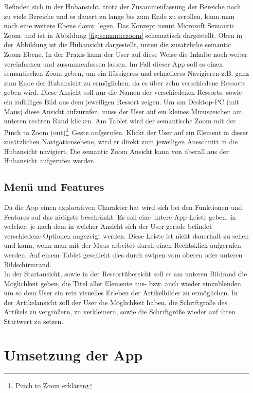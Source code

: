 \documentclass[12pt,a4paper]{scrartcl}
\begin{document}
Befinden sich in der Hubansicht, trotz der Zusammenfassung der Bereiche noch zu viele Bereiche und es dauert zu lange bis zum Ende zu scrollen, kann man noch eine weitere Ebene \glqq davor\grqq\ legen. Das Konzept nennt Microsoft \glqq Semantic Zoom\grqq\ und ist in Abbildung \ref{fig:semanticzoom} schematisch dargestellt. Oben in der Abbildung ist die Hubansicht dargestellt, unten die zusätzliche semantic Zoom Ebene. In der Praxis kann der User auf diese Weise die Inhalte noch weiter vereinfachen und zusammenfassen lassen. Im Fall dieser App soll es einen semantischen Zoom geben, um ein flüssigeres und schnelleres Navigieren z.B. ganz zum Ende der Hubansicht zu ermöglichen, da es über zehn verschiedene Ressorts geben wird. Diese Ansicht soll nur die Namen der verschiedenen Ressorts, sowie ein zufälliges Bild aus dem jeweiligen Ressort zeigen. Um am Desktop-PC (mit Maus) diese Ansicht aufzurufen, muss der User auf ein kleines Minuszeichen am unteren rechten Rand klicken. Am Tablet wird der semantische Zoom mit der \glqq Pinch to Zoom (out)\footnote{Pinch to Zoom erklären}\grqq\  Geste aufgerufen. Klickt der User auf ein Element in dieser zusätzlichen Navigationsebene, wird er direkt zum jeweiligen Ausschnitt in die Hubansicht navigiert. Die semantic Zoom Ansicht kann von überall aus der Hubansicht aufgerufen werden.    


\subsection{Menü und Features}
\label{subsec:menuandproperties}
Da die App einen explorativen Charakter hat wird sich bei den Funktionen und Features auf das nötigste beschränkt. Es soll eine untere App-Leiste geben, in welcher, je nach dem in welcher Ansicht sich der User gerade befindet verschiedene Optionen angezeigt werden. Diese Leiste ist nicht dauerhaft zu sehen und kann, wenn man mit der Maus arbeitet durch einen Rechtsklick aufgerufen werden. Auf einem Tablet geschieht dies durch swipen vom oberen oder unteren Bildschirmrand.\\
In der Startansicht, sowie in der Ressortübersicht soll es am unteren Bildrand die Möglichkeit geben, die Titel aller Elemente aus- bzw. auch wieder einzublenden um so dem User ein rein visuelles Erleben der Artikelbilder zu ermöglichen. In der Artikelansicht soll der User die Möglichkeit haben, die Schriftgröße des Artikels zu vergrößern, zu verkleinern, sowie die Schriftgröße wieder auf ihren Startwert zu setzen. 

\newpage
\section{Umsetzung der App}
\label{sec:umsetzungderapp}
\end{document}
